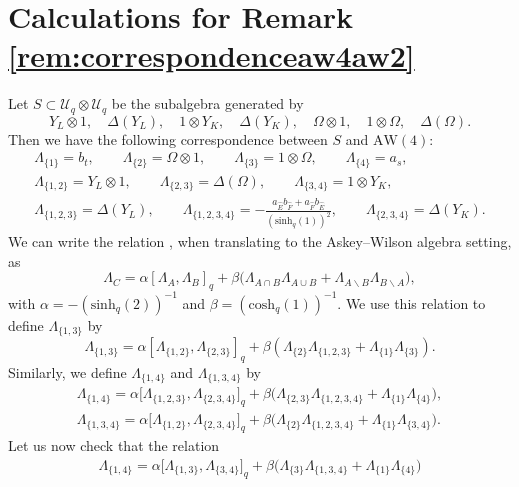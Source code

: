 \documentclass[pdftex]{sigma}
\numberwithin{equation}{section}
\newcommand{\chq}{\mathrm{cosh}_q}
\newcommand{\shq}{\mathrm{sinh}_q}
\newcommand{\Uq}{\mathcal{U}_q}
\begin{document}
\section{Calculations for Remark \ref{rem:correspondenceaw4aw2}}\label{app:calculationsrelationsAW4}
Let $S\subset \Uq\otimes\Uq$ be the subalgebra generated by
\[Y_L\otimes 1,\quad \Delta(Y_L),\quad 1\otimes Y_K,\quad \Delta(Y_K),\quad \Omega\otimes 1,\quad 1\otimes \Omega,\quad \Delta(\Omega).\]
Then we have the following correspondence between $S$ and $\mathrm{AW}(4)$:
\begin{gather}
		\Lambda_{\{1\}} =b_t, \qquad \Lambda_{\{2\}}=\Omega\otimes 1, \qquad \Lambda_{\{3\}}=1 \otimes \Omega, \qquad \Lambda_{\{4\}}=a_s, \nonumber\\
		\Lambda_{\{1,2\}} =Y_L\otimes 1,\qquad \Lambda_{\{2,3\}}=\Delta(\Omega), \qquad \Lambda_{\{3,4\}}=1\otimes Y_K, \nonumber\\
		\Lambda_{\{1,2,3\}} =\Delta(Y_L), \qquad \Lambda_{\{1,2,3,4\}}=-\frac{a_{\hat{E}}b_{\hat{F}}+a_{\hat{F}}b_{\hat{E}}}{(\shq(1))^2}, \qquad \Lambda_{\{2,3,4\}} =\Delta(Y_K).\label{eq:StoAW4}
	\end{gather}
We can write the relation \cite[equation~(23)]{DeBie2020}, when translating to the Askey--Wilson algebra setting, as
\[
\Lambda_{C}=\alpha[\Lambda_{A},\Lambda_{B}]_q + \beta\big(\Lambda_{A\cap B}\Lambda_{A\cup B}+\Lambda_{A\backslash B}\Lambda_{B\backslash A}\big),
\]
with $\alpha= -(\shq(2))^{-1}$ and $\beta=(\chq(1))^{-1}$. We use this relation to define $\Lambda_{\{1,3\}}$ by
\[
\Lambda_{\{1,3\}}=\alpha[\Lambda_{\{1,2\}},\Lambda_{\{2,3\}}]_q + \beta \left( \Lambda_{\{2\}}\Lambda_{\{1,2,3\}}+\Lambda_{\{1\}}\Lambda_{\{3\}} \right).
\]
Similarly, we define $\Lambda_{\{1,4\}}$ and $\Lambda_{\{1,3,4\}}$ by
\begin{gather*}
	\Lambda_{\{1,4\}}=\alpha \big[\Lambda_{\{1,2,3\}},\Lambda_{\{2,3,4\}} \big]_q + \beta \big( \Lambda_{\{2,3\}}\Lambda_{\{1,2,3,4\}}+\Lambda_{\{1\}}\Lambda_{\{4\}} \big),\\
	\Lambda_{\{1,3,4\}}=\alpha \big[\Lambda_{\{1,2\}},\Lambda_{\{2,3,4\}} \big]_q + \beta \big( \Lambda_{\{2\}}\Lambda_{\{1,2,3,4\}}+\Lambda_{\{1\}}\Lambda_{\{3,4\}} \big).
\end{gather*}
Let us now check that the relation
\begin{gather}
	\Lambda_{\{1,4\}}=\alpha \big[\Lambda_{\{1,3\}},\Lambda_{\{3,4\}} \big]_q + \beta \big( \Lambda_{\{3\}}\Lambda_{\{1,3,4\}}+\Lambda_{\{1\}}\Lambda_{\{4\}} \big)\label{eq:relationtocheck}
\end{gather}
\end{document}

